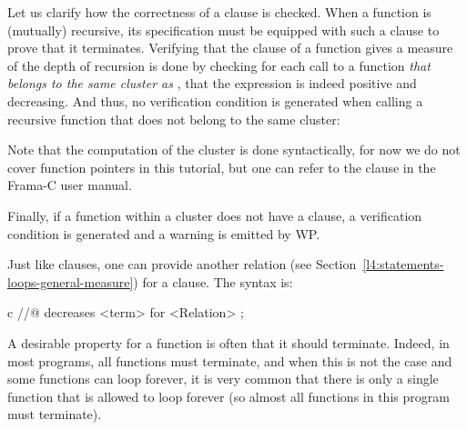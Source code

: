 Let us clarify how the correctness of
a  clause is checked. When a function is (mutually)
recursive, its specification must be equipped with such a clause to prove that
it terminates. Verifying that the  clause of a function
 gives a measure of the depth of recursion is done by checking for
each call to a function \emph{that belongs to the same cluster as
}, that the expression is indeed positive and decreasing. And
thus, no verification condition is generated when calling a recursive function
that does not belong to the same cluster:




\begin{Information}
  Note that the computation of the cluster is done syntactically, for now we do
  not cover function pointers in this tutorial, but one can refer to the clause
   in the Frama-C user manual.
\end{Information}


Finally, if a function within a cluster does not have a 
clause, a  verification condition is generated
and a warning is emitted by WP.






\begin{Information}
  Just like  clauses, one can provide another relation
  (see Section~\ref{l4:statements-loops-general-measure}) for a
   clause. The syntax is:


  \begin{CodeBlock}{c}
//@ decreases <term> for <Relation> ;
\end{CodeBlock}
\end{Information}


\label{l3:statements-function-calls-terminates}


A desirable property for a function is often that it should terminate. Indeed,
in most programs, all functions must terminate, and when this is not the case and
some functions can loop forever, it is very common that there is only a single
function that is allowed to loop forever (so almost all functions in this
program must terminate).




